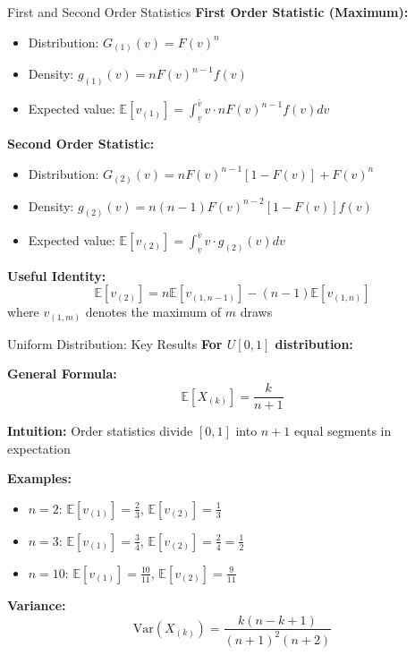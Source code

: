 \documentclass[xcolor={x11names}]{beamer}
\begin{document}
\begin{frame}{First and Second Order Statistics}
\textbf{First Order Statistic (Maximum):}
\begin{itemize}
  \item Distribution: $G_{(1)}(v) = F(v)^n$
  \item Density: $g_{(1)}(v) = nF(v)^{n-1}f(v)$
  \item Expected value: $\mathbb{E}[v_{(1)}] = \int_{\underline{v}}^{\bar{v}} v \cdot nF(v)^{n-1}f(v)dv$
\end{itemize}


\textbf{Second Order Statistic:}
\begin{itemize}
  \item Distribution: $G_{(2)}(v) = nF(v)^{n-1}[1-F(v)] + F(v)^n$
  \item Density: $g_{(2)}(v) = n(n-1)F(v)^{n-2}[1-F(v)]f(v)$
  \item Expected value: $\mathbb{E}[v_{(2)}] = \int_{\underline{v}}^{\bar{v}} v \cdot g_{(2)}(v)dv$
\end{itemize}

\textbf{Useful Identity:}
\[\mathbb{E}[v_{(2)}] = n\mathbb{E}[v_{(1,n-1)}] - (n-1)\mathbb{E}[v_{(1,n)}]\]
where $v_{(1,m)}$ denotes the maximum of $m$ draws
\end{frame}

\begin{frame}{Uniform Distribution: Key Results}
\textbf{For $U[0,1]$ distribution:}


\textbf{General Formula:}
\[\mathbb{E}[X_{(k)}] = \frac{k}{n+1}\]


\textbf{Intuition:} Order statistics divide $[0,1]$ into $n+1$ equal segments in expectation


\textbf{Examples:}
\begin{itemize}
  \item $n=2$: $\mathbb{E}[v_{(1)}] = \frac{2}{3}$, $\mathbb{E}[v_{(2)}] = \frac{1}{3}$
  \item $n=3$: $\mathbb{E}[v_{(1)}] = \frac{3}{4}$, $\mathbb{E}[v_{(2)}] = \frac{2}{4} = \frac{1}{2}$
  \item $n=10$: $\mathbb{E}[v_{(1)}] = \frac{10}{11}$, $\mathbb{E}[v_{(2)}] = \frac{9}{11}$
\end{itemize}

\textbf{Variance:}
\[\text{Var}(X_{(k)}) = \frac{k(n-k+1)}{(n+1)^2(n+2)}\]
\end{frame}
\end{document}
